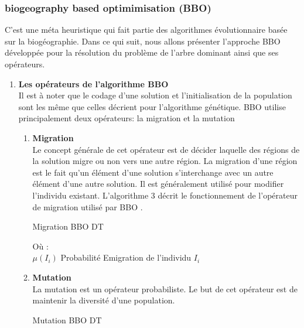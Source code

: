 \subsubsection{biogeography based optimimisation (BBO)}
C’est une méta heuristique qui fait partie des algorithmes évolutionnaire basée sur la biogéographie. Dans ce qui suit, nous allons présenter l’approche BBO développée pour la résolution du problème de l’arbre dominant ainsi que ses opérateurs.

\begin{enumerate}
	\item \textbf{Les opérateurs de l’algorithme BBO}\\
	Il est à noter que le codage d’une solution et l’initialisation de la population sont les même  que celles décrient pour l’algorithme génétique. BBO utilise principalement deux opérateurs: la migration et la mutation 
	\begin{enumerate}[label=\alph*)]
		\item \textbf{Migration}\\
		Le concept générale de cet opérateur est de décider laquelle des régions de la solution migre ou non vers une autre région. La migration d’une région est le fait qu’un élément d’une solution s’interchange avec un autre élément d’une autre solution. Il est généralement utilisé pour modifier l’individu existant. L’algorithme 3 décrit le fonctionnement de l’opérateur de migration utilisé par BBO . 
		
\begin{algorithm}[H]
\caption{Migration BBO DT}
\SetAlgoLined
\DontPrintSemicolon


\end{algorithm}		

Où :\\
$\mu(I_i)$ Probabilité Emigration de l'individu $I_i$ \\
		
	\item \textbf{Mutation}\\
	La mutation est un opérateur probabiliste. Le but de cet opérateur est de maintenir la diversité d’une population.
	
\begin{algorithm}[H]
\caption{Mutation BBO DT}
\SetAlgoLined
\DontPrintSemicolon


\end{algorithm}
\end{enumerate}
\end{enumerate}
